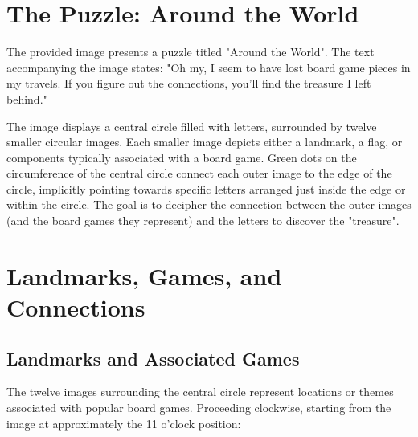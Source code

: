\documentclass{article}
\begin{document}
\sloppy

\section{The Puzzle: Around the World}

The provided image presents a puzzle titled "Around the World". The text accompanying the image states: "Oh my, I seem to have lost board game pieces in my travels. If you figure out the connections, you'll find the treasure I left behind."

The image displays a central circle filled with letters, surrounded by twelve smaller circular images. Each smaller image depicts either a landmark, a flag, or components typically associated with a board game. Green dots on the circumference of the central circle connect each outer image to the edge of the circle, implicitly pointing towards specific letters arranged just inside the edge or within the circle. The goal is to decipher the connection between the outer images (and the board games they represent) and the letters to discover the "treasure".

\section{Landmarks, Games, and Connections}

\subsection{Landmarks and Associated Games}

The twelve images surrounding the central circle represent locations or themes associated with popular board games. Proceeding clockwise, starting from the image at approximately the 11 o'clock position:
\end{document}

